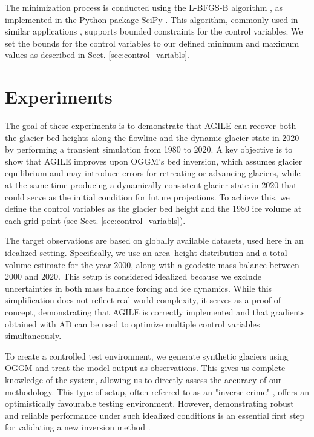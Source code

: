 \documentclass[journal abbreviation, manuscript]{copernicus}
\begin{document}
The minimization process is conducted using the L-BFGS-B algorithm \citep{Byrd1995, Zhu1997, Morales2011}, as implemented in the \textsf{Python} package \textsf{SciPy} \citep[][\href{https://www.scipy.org/}{https://www.scipy.org/}]{2020SciPy-NMeth}. This algorithm, commonly used in similar applications \citep[e.g.,][]{Goldberg2013, Fuerst2017}, supports bounded constraints for the control variables. We set the bounds for the control variables to our defined minimum and maximum values as described in Sect. \ref{sec:control_variabls}.


\section{Experiments}
\label{sec:experiments}

The goal of these experiments is to demonstrate that AGILE can recover both the glacier bed heights along the flowline and the dynamic glacier state in 2020 by performing a transient simulation from 1980 to 2020. A key objective is to show that AGILE improves upon OGGM’s bed inversion, which assumes glacier equilibrium and may introduce errors for retreating or advancing glaciers, while at the same time producing a dynamically consistent glacier state in 2020 that could serve as the initial condition for future projections. To achieve this, we define the control variables as the glacier bed height and the 1980 ice volume at each grid point (see Sect. \ref{sec:control_variabls}).

The target observations are based on globally available datasets, used here in an idealized setting. Specifically, we use an area–height distribution and a total volume estimate for the year 2000, along with a geodetic mass balance between 2000 and 2020. This setup is considered idealized because we exclude uncertainties in both mass balance forcing and ice dynamics. While this simplification does not reflect real-world complexity, it serves as a proof of concept, demonstrating that AGILE is correctly implemented and that gradients obtained with AD can be used to optimize multiple control variables simultaneously.

To create a controlled test environment, we generate synthetic glaciers using OGGM and treat the model output as observations. This gives us complete knowledge of the system, allowing us to directly assess the accuracy of our methodology. This type of setup, often referred to as an "inverse crime" \citep{Colton2013}, offers an optimistically favourable testing environment. However, demonstrating robust and reliable performance under such idealized conditions is an essential first step for validating a new inversion method \citep{Goldberg2013}.
\end{document}
